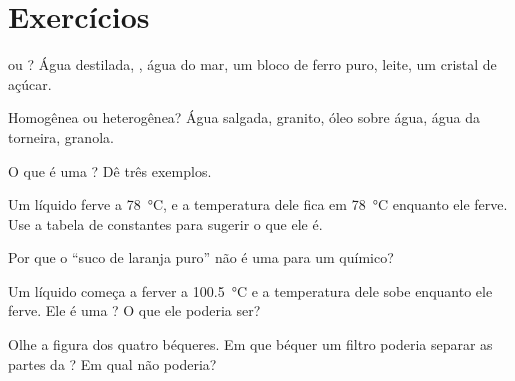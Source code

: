 \section{Exercícios}

\begin{exercise}[$\star$]\label{exo:g6:pure-substances-and-mixtures:1}
 ou ? Água destilada, , água do mar, um bloco
de ferro puro, leite, um cristal de açúcar.
\end{exercise}

\begin{exercise}[$\star$]\label{exo:g6:pure-substances-and-mixtures:2}
Homogênea ou heterogênea? Água salgada, granito, óleo sobre água, água da
torneira, granola.
\end{exercise}

\begin{exercise}[$\star$]\label{exo:g6:pure-substances-and-mixtures:3}
O que é uma ? Dê três exemplos.
\end{exercise}

\begin{exercise}[$\star$]\label{exo:g6:pure-substances-and-mixtures:4}
Um líquido ferve a \qty{78}{\celsius}, e a temperatura dele fica em
\qty{78}{\celsius} enquanto ele ferve. Use a tabela de constantes para
sugerir o que ele é.
\end{exercise}

\begin{exercise}[$\star$]\label{exo:g6:pure-substances-and-mixtures:5}
Por que o ``suco de laranja puro'' não é uma  para um
químico?
\end{exercise}

\begin{exercise}[$\star\star$]\label{exo:g6:pure-substances-and-mixtures:6}
Um líquido começa a ferver a \qty{100.5}{\celsius} e a temperatura dele
sobe enquanto ele ferve. Ele é uma ? O que ele poderia
ser?
\end{exercise}

\begin{exercise}[$\star\star$]\label{exo:g6:pure-substances-and-mixtures:7}
Olhe a figura dos quatro béqueres. Em que béquer um filtro poderia
separar as partes da ? Em qual não poderia?
\end{exercise}

